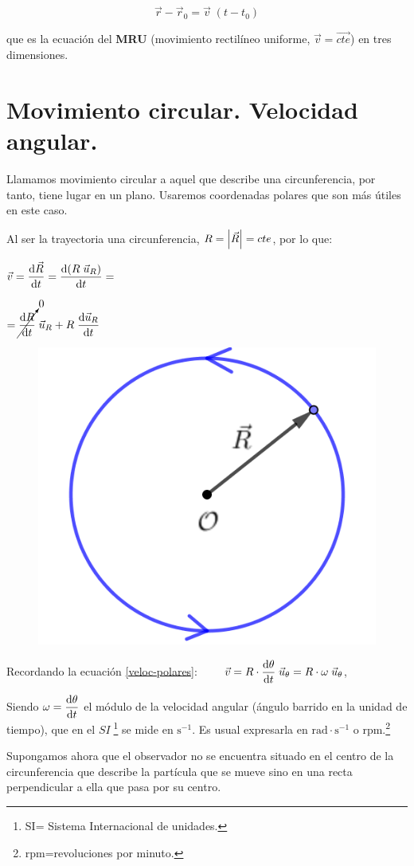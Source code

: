 \begin{equation}
\label{MRU}
	 \vec r-\vec r_0=\vec v\; (t-t_0) 
\end{equation}

que es la ecuación del \textbf{MRU} (movimiento rectilíneo uniforme, $\vec v = \overrightarrow{cte}$) en tres dimensiones.

\vspace{-4mm}\section{Movimiento circular. Velocidad angular.}

Llamamos movimiento circular a aquel que describe una circunferencia, por tanto, tiene lugar en un plano. Usaremos coordenadas polares que son más útiles en este caso.

Al ser la trayectoria una circunferencia, $R=\abs{\vec R}=cte$, por lo que:

\begin{multicols}{2}

$\displaystyle \vec v=\dv{\vec R}{t}=\dv{(R\;\vec u_R)}{t}=$

$\displaystyle =\cancelto{0}{\dv{R}{t}}\;\vec u_R+R\; \dv{\vec u_R}{t}$
\begin{figure}[H]
		\centering
		\includegraphics[width=.2\textwidth]{imagenes/imagenes02/T02IM06.png}
		\end{figure}
\end{multicols}

Recordando la ecuación \ref{veloc-polares}:
$\qquad \displaystyle \vec v=R\cdot \dv{\theta}{t}\;\vec u_\theta=R\cdot \omega \; \vec u_\theta$,

Siendo $\displaystyle \omega=\dv{\theta}{t}$ el módulo de la velocidad angular (ángulo barrido en la unidad de tiempo), que en el $SI\;$\footnote{ SI= Sistema Internacional de unidades.} se mide en $\mathrm{s}^{-1}$. Es usual expresarla en $\text{rad}\cdot \mathrm{s}^{-1}$ o $\text{rpm}$.\footnote{ rpm=revoluciones por minuto.}

Supongamos ahora que el observador no se encuentra situado en el centro de la circunferencia que describe la partícula que se mueve sino en una recta perpendicular a ella que pasa por su centro.

